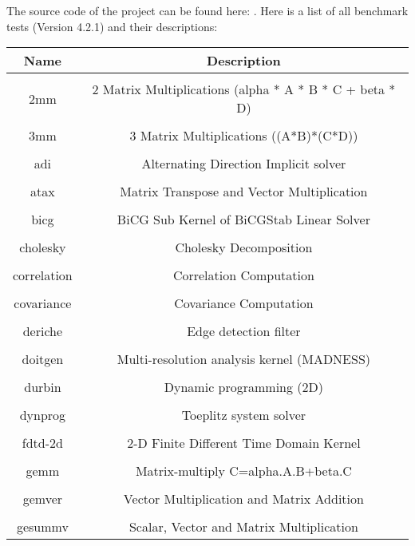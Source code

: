 The source code of the project can be found here: \href{https://web.cse.ohio-state.edu/~pouchet.2/software/polybench/}{\color{blue}{The Polyhedral Benchmark Suite}}. Here is a list of all benchmark tests (Version 4.2.1) and their descriptions:

\newpage
\bigskip
\begin{table}[h!]
\centering
\begin{tabular}{||c c||} 
\hline
Name & Description \\ [1ex] 
\hline\hline
 & \\
2mm & 2 Matrix Multiplications (alpha * A * B * C + beta * D) \\ 
 & \\
3mm & 3 Matrix Multiplications ((A*B)*(C*D)) \\ 
 & \\
adi & Alternating Direction Implicit solver \\ 
 & \\
atax & Matrix Transpose and Vector Multiplication \\ 
 & \\
bicg & BiCG Sub Kernel of BiCGStab Linear Solver \\ 
 & \\
cholesky & Cholesky Decomposition \\ 
 & \\
correlation & Correlation Computation \\ 
 & \\
covariance & Covariance Computation \\ 
 & \\
deriche & Edge detection filter \\ 
 & \\
doitgen & Multi-resolution analysis kernel (MADNESS) \\ 
 & \\
durbin & Dynamic programming (2D) \\ 
 & \\
dynprog & Toeplitz system solver \\ 
 & \\
fdtd-2d & 2-D Finite Different Time Domain Kernel \\ 
 & \\
gemm & Matrix-multiply C=alpha.A.B+beta.C \\ 
 & \\
gemver & Vector Multiplication and Matrix Addition \\ 
 & \\
gesummv & Scalar, Vector and Matrix Multiplication \\

\end{tabular}
\end{table}
